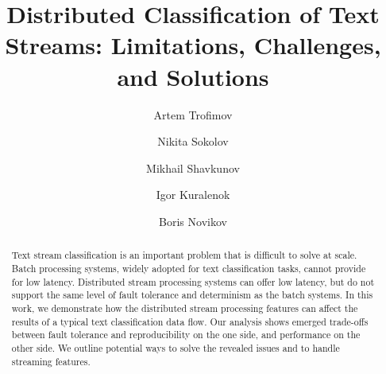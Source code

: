 \documentclass[sigconf]{acmart}
\theoremstyle{remark}
\begin{document}

\title {Distributed Classification of Text Streams: Limitations, Challenges, and Solutions}


\author{Artem Trofimov}

\author{Nikita Sokolov}

\author{Mikhail Shavkunov}

\author{Igor Kuralenok}

\author{Boris Novikov}

\begin{abstract}

Text stream classification is an important problem that is difficult to solve at scale. 
Batch processing systems, widely adopted for text classification tasks,   cannot provide for low latency. 
Distributed stream processing systems can offer low latency, but do not support the same level of fault tolerance and determinism as the batch systems. 
In this work, we demonstrate how the distributed stream processing features can affect the results of a typical text classification data flow. 
Our analysis shows emerged trade-offs between fault tolerance and reproducibility on the one side, and performance on the other side. 
We outline potential ways to solve the revealed issues and to handle streaming features.

\end{abstract}
\end{document}
